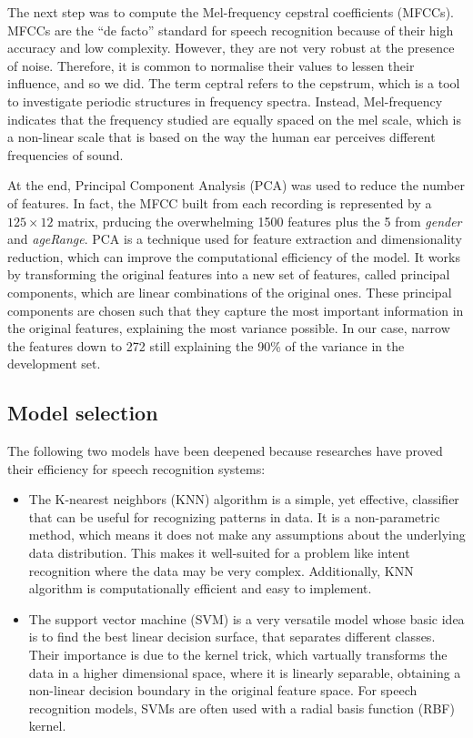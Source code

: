 \documentclass[conference]{IEEEtran}
\begin{document}
The next step was to compute the Mel-frequency cepstral coefficients (MFCCs).
MFCCs are the “de facto” standard for speech recognition because of their high accuracy and low complexity.
However, they are not very robust at the presence of noise.
Therefore, it is common to normalise their values to lessen their influence, and so we did.
The term ceptral refers to the cepstrum, which is a tool to investigate periodic structures in frequency spectra.
Instead, Mel-frequency indicates that the frequency studied are equally spaced on the mel scale, which is a non-linear scale that is based on the way the human ear perceives different frequencies of sound.

At the end, Principal Component Analysis (PCA) was used to reduce the number of features.
In fact, the MFCC built from each recording is represented by a $125 \times 12$ matrix, prducing the overwhelming 1500 features plus the 5 from \textit{gender} and \textit{ageRange}.
PCA is a technique used for feature extraction and dimensionality reduction, which can improve the computational efficiency of the model.
It works by transforming the original features into a new set of features, called principal components, which are linear combinations of the original ones.
These principal components are chosen such that they capture the most important information in the original features, explaining the most variance possible.
In our case, narrow the features down to 272 still explaining the 90\% of the variance in the development set.

\subsection{Model selection}
The following two models have been deepened because researches have proved their efficiency for speech recognition systems:
\begin{itemize}
    \item The K-nearest neighbors (KNN) algorithm is a simple, yet effective, classifier that can be useful for recognizing patterns in data.
    It is a non-parametric method, which means it does not make any assumptions about the underlying data distribution.
    This makes it well-suited for a problem like intent recognition where the data may be very complex.
    Additionally, KNN algorithm is computationally efficient and easy to implement.

    \item The support vector machine (SVM) is a very versatile model whose basic idea is to find the best linear decision surface, that separates different classes.
    Their importance is due to the kernel trick, which vartually transforms the data in a higher dimensional space, where it is linearly separable, obtaining a non-linear decision boundary in the original feature space.
    For speech recognition models, SVMs are often used with a radial basis function (RBF) kernel.
\end{itemize}
\end{document}
